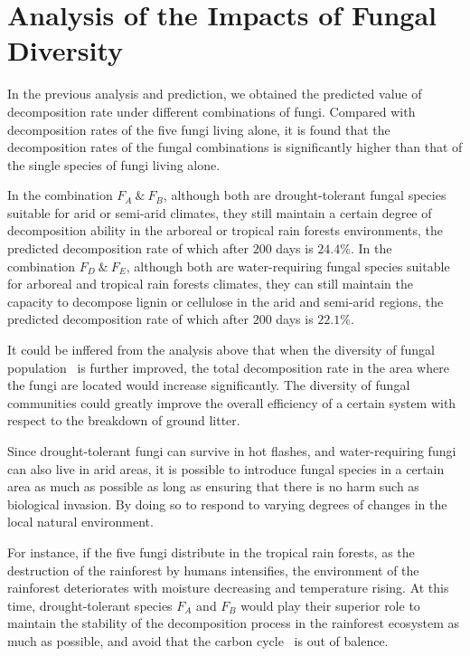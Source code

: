\section{Analysis of the Impacts of Fungal Diversity}
In the previous analysis and prediction, we obtained the predicted value of decomposition rate under different combinations of fungi. Compared with decomposition rates of the five fungi living alone, it is found that the decomposition rates of the fungal combinations is significantly higher than that of the single species of fungi living alone.
\par
In the combination $F_A\ \&\ F_B$, although both are drought-tolerant fungal species suitable for arid or semi-arid climates, they still maintain a certain degree of decomposition ability in the arboreal or tropical rain forests environments, the predicted decomposition rate of which after $200$ days is $24.4\%$. In the combination $F_D\ \&\ F_E$, although both are water-requiring fungal species suitable for arboreal and tropical rain forests climates, they can still maintain the capacity to decompose lignin or cellulose in the arid and semi-arid regions, the predicted decomposition rate of which after $200$ days is $22.1\%$.
\par
It could be inffered from the analysis above that when the diversity of fungal population~\cite{population} is further improved, the total decomposition rate in the area where the fungi are located would increase significantly. The diversity of fungal communities could greatly improve the overall efficiency of a certain system with respect to the breakdown of ground litter.
\par
Since drought-tolerant fungi can survive in hot flashes, and water-requiring fungi can also live in arid areas, it is possible to introduce fungal species in a certain area as much as possible as long as ensuring that there is no harm such as biological invasion. By doing so to respond to varying degrees of changes in the local natural environment.
\par
For instance, if the five fungi distribute in the tropical rain forests, as the destruction of the rainforest by humans intensifies, the environment of the rainforest deteriorates with moisture decreasing and temperature rising. At this time, drought-tolerant species $F_A$ and $F_B$ would play their superior role to maintain the stability of the decomposition process in the rainforest ecosystem as much as possible, and avoid that the carbon cycle~\cite{carboncircle} is out of balence.